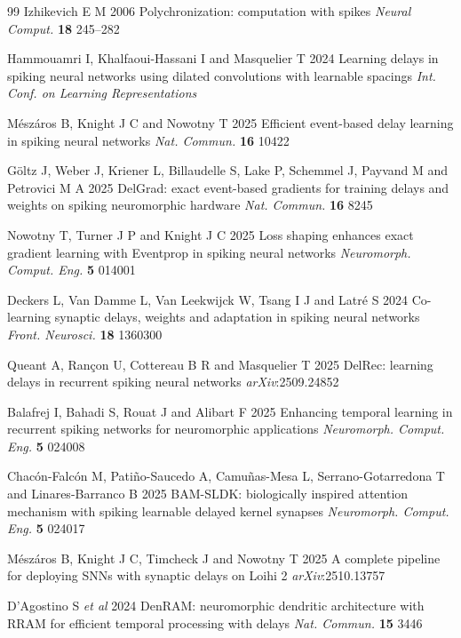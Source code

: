 \documentclass{iopjournal}
\begin{document}
\begin{thebibliography}{99}
 Izhikevich E M 2006 Polychronization: computation with spikes \textit{Neural Comput.} \textbf{18} 245--282

 Hammouamri I, Khalfaoui-Hassani I and Masquelier T 2024 Learning delays in spiking neural networks using dilated convolutions with learnable spacings \textit{Int. Conf. on Learning Representations}

 M\'esz\'aros B, Knight J C and Nowotny T 2025 Efficient event-based delay learning in spiking neural networks \textit{Nat. Commun.} \textbf{16} 10422

 G\"oltz J, Weber J, Kriener L, Billaudelle S, Lake P, Schemmel J, Payvand M and Petrovici M A 2025 DelGrad: exact event-based gradients for training delays and weights on spiking neuromorphic hardware \textit{Nat. Commun.} \textbf{16} 8245

 Nowotny T, Turner J P and Knight J C 2025 Loss shaping enhances exact gradient learning with Eventprop in spiking neural networks \textit{Neuromorph. Comput. Eng.} \textbf{5} 014001

 Deckers L, Van Damme L, Van Leekwijck W, Tsang I J and Latr\'e S 2024 Co-learning synaptic delays, weights and adaptation in spiking neural networks \textit{Front. Neurosci.} \textbf{18} 1360300

 Queant A, Ran\c{c}on U, Cottereau B R and Masquelier T 2025 DelRec: learning delays in recurrent spiking neural networks \textit{arXiv}:2509.24852

 Balafrej I, Bahadi S, Rouat J and Alibart F 2025 Enhancing temporal learning in recurrent spiking networks for neuromorphic applications \textit{Neuromorph. Comput. Eng.} \textbf{5} 024008

 Chac\'on-Falc\'on M, Pati\~no-Saucedo A, Camu\~nas-Mesa L, Serrano-Gotarredona T and Linares-Barranco B 2025 BAM-SLDK: biologically inspired attention mechanism with spiking learnable delayed kernel synapses \textit{Neuromorph. Comput. Eng.} \textbf{5} 024017

 M\'esz\'aros B, Knight J C, Timcheck J and Nowotny T 2025 A complete pipeline for deploying SNNs with synaptic delays on Loihi 2 \textit{arXiv}:2510.13757

 D'Agostino S \textit{et al} 2024 DenRAM: neuromorphic dendritic architecture with RRAM for efficient temporal processing with delays \textit{Nat. Commun.} \textbf{15} 3446


\end{thebibliography}
\end{document}
